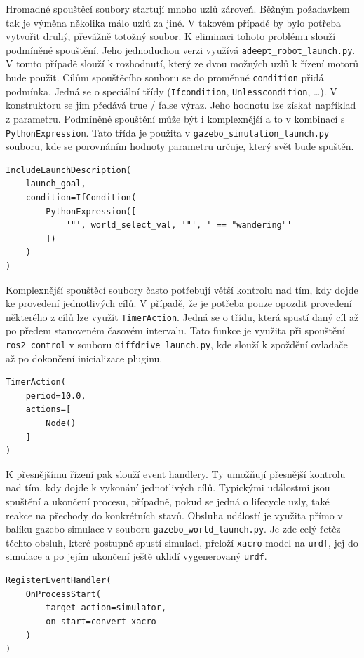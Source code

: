 Hromadné spouštěcí soubory startují mnoho uzlů zároveň. Běžným požadavkem tak je výměna několika málo uzlů za jiné. V takovém případě by bylo potřeba vytvořit druhý, převážně totožný soubor. K eliminaci tohoto problému slouží podmíněné spouštění. Jeho jednoduchou verzi využívá \verb|adeept_robot_launch.py|. V tomto případě slouží k rozhodnutí, který ze dvou možných uzlů k řízení motorů bude použit. Cílům spouštěcího souboru se do proměnné \verb|condition| přidá podmínka. Jedná se o speciální třídy (\verb|Ifcondition|, \verb|Unlesscondition|, \dots). V konstruktoru se jim předává true / false výraz. Jeho hodnotu lze získat například z parametru. Podmíněné spouštění může být i komplexnější a to v kombinací s \verb|PythonExpression|. Tato třída je použita v \verb|gazebo_simulation_launch.py| souboru, kde se porovnáním hodnoty parametru určuje, který svět bude spuštěn.
\begin{verbatim}
IncludeLaunchDescription(
    launch_goal,
    condition=IfCondition(
        PythonExpression([
            '"', world_select_val, '"', ' == "wandering"'
        ])
    )
)
\end{verbatim}

Komplexnější spouštěcí soubory často potřebují větší kontrolu nad tím, kdy dojde ke provedení jednotlivých cílů. V případě, že je potřeba pouze opozdit provedení některého z cílů lze využít \verb|TimerAction|. Jedná se o třídu, která spustí daný cíl až po předem stanoveném časovém intervalu. Tato funkce je využita při spouštění \verb|ros2_control| v souboru \verb|diffdrive_launch.py|, kde slouží k zpoždění  ovladače až po dokončení inicializace pluginu.
\begin{verbatim}
TimerAction(
    period=10.0,
    actions=[
        Node()
    ]
)
\end{verbatim}

K přesnějšímu řízení pak slouží event handlery. Ty umožňují přesnější kontrolu nad tím, kdy dojde k vykonání jednotlivých cílů. Typickými událostmi jsou spuštění a ukončení procesu, případně, pokud se jedná o lifecycle uzly, také reakce na přechody do konkrétních stavů. Obsluha událostí je využita přímo v balíku gazebo simulace v souboru \verb|gazebo_world_launch.py|. Je zde celý řetěz těchto obsluh, které postupně spustí simulaci, přeloží \verb|xacro| model na \verb|urdf|,  jej do simulace a po jejím ukončení ještě uklidí vygenerovaný \verb|urdf|.
\begin{verbatim}
RegisterEventHandler(
    OnProcessStart(
        target_action=simulator,
        on_start=convert_xacro
    )
)
\end{verbatim}

